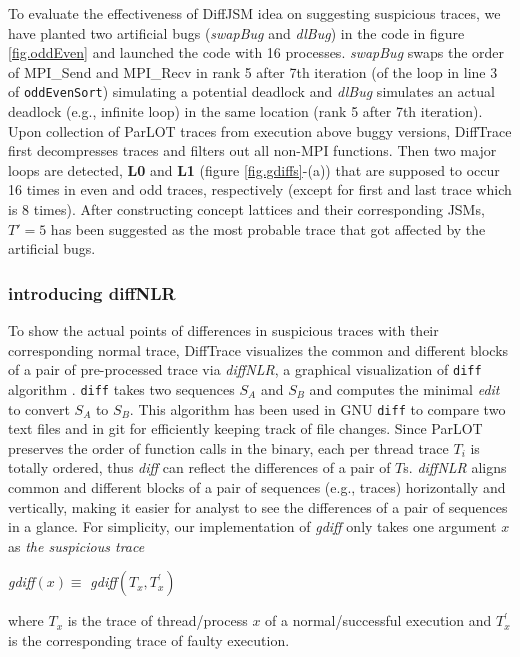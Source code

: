 To evaluate the effectiveness of DiffJSM idea on suggesting suspicious traces, we have planted two artificial bugs (\textit{swapBug} and \textit{dlBug}) in the code in figure \ref{fig.oddEven} and launched the code with 16 processes. 
%
\textit{swapBug} swaps the order of MPI\_Send and MPI\_Recv in rank 5 after 7th iteration (of the loop in line 3 of \texttt{oddEvenSort}) simulating a potential deadlock and \textit{dlBug} simulates an actual deadlock (e.g., infinite loop) in the same location (rank 5 after 7th iteration).
%
Upon collection of ParLOT traces from execution above buggy versions, DiffTrace first decompresses traces and filters out all non-MPI functions.
Then two major loops are detected, \textbf{L0} and \textbf{L1}  (figure \ref{fig.gdiffs}-(a)) that are supposed to occur 16 times in even and odd traces, respectively (except for first and last trace which is 8 times).
After constructing concept lattices and their corresponding JSMs, $T\prime=5$ has been suggested as the most probable trace that got affected by the artificial bugs.

\subsubsection{introducing diffNLR}
To show the actual points of differences in suspicious traces with their corresponding normal trace, DiffTrace visualizes the common and different blocks of a pair of pre-processed trace via \textit{diffNLR}, a graphical visualization of \texttt{diff} algorithm \cite{diff-myers}.
%
\texttt{diff} takes two sequences $S_A$ and $S_B$ and computes the minimal \textit{edit} to convert $S_A$ to $S_B$. This algorithm has been used in GNU \texttt{diff} to compare two text files and in git for efficiently keeping track of file changes.
Since ParLOT preserves the order of function calls in the binary, each per thread trace $T_i$ is totally ordered, thus \textit{diff} can reflect the differences of a pair of $T$s. \textit{diffNLR} aligns common and different blocks of a pair of sequences (e.g., traces) horizontally and vertically, making it easier for analyst to see the differences of a pair of sequences in a glance.  
For simplicity, our implementation of \textit{gdiff} only takes one argument $x$ as \textit{the suspicious trace}

\textit{gdiff}$(x) \equiv $ \textit{gdiff}$(T_x,T_x^\prime)$

where $T_x$ is the trace of thread/process $x$ of a normal/successful execution and $T^\prime_x$ is the corresponding trace of faulty execution.

